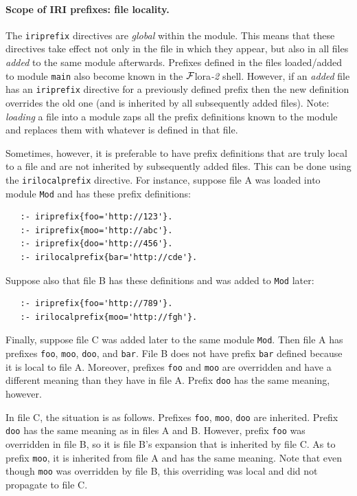 \documentclass[11pt]{article}
\newcommand{\FLORA}{{\mbox{\sc ${\cal F}${lora}\rm\emph{-2}}}\xspace}
\newcommand{\FLSYSTEM}{\FLORA}
\begin{document}
\paragraph{Scope of IRI prefixes: file locality.}
The \texttt{iriprefix}  directives are \emph{global} within the module. 
This means that these directives take effect not only in the file in which they appear,
but also in all files \emph{added} to the same module afterwards.
Prefixes defined in  the files loaded/added to module \texttt{main}  also
become known in the \FLSYSTEM shell. However, if an \emph{added} file has an
\texttt{iriprefix} directive for a previously defined prefix then the new
definition overrides the old one (and is inherited by all subsequently
added files). Note: \emph{loading}  a file into a module
zaps all the prefix definitions known  
to the module and replaces them with whatever is defined in that file.

Sometimes, however, it is preferable to have prefix definitions that are
truly local to a file and are not inherited by subsequently added files.
This can be done using the \texttt{irilocalprefix} directive. For instance,
suppose file A was loaded into module \texttt{Mod} and
has these prefix definitions:
\begin{verbatim}
   :- iriprefix{foo='http://123'}.
   :- iriprefix{moo='http://abc'}.
   :- iriprefix{doo='http://456'}.
   :- irilocalprefix{bar='http://cde'}.
\end{verbatim}
Suppose also that file B has these definitions and was added to
\texttt{Mod} later: 
\begin{verbatim}
   :- iriprefix{foo='http://789'}.
   :- irilocalprefix{moo='http://fgh'}.
\end{verbatim}
Finally, suppose file C was added later to the same module \texttt{Mod}.
Then file A has prefixes \texttt{foo}, \texttt{moo}, \texttt{doo}, and
\texttt{bar}. File B does not have prefix \texttt{bar} defined because it
is local to file A. Moreover, prefixes \texttt{foo} and \texttt{moo} are
overridden and have a different meaning than they have in file A. Prefix
\texttt{doo} has the same meaning, however.

In file C, the situation is as follows. Prefixes \texttt{foo},
\texttt{moo}, \texttt{doo} are inherited. Prefix \texttt{doo} has the same
meaning as in files A and B. However, prefix \texttt{foo} was overridden
in file B, so it is file B's expansion that is inherited by file C.
As to prefix \texttt{moo}, it is inherited from file A and has the same
meaning. Note that even though \texttt{moo} was overridden by file B, this
overriding was local and did not propagate to file C.  
\end{document}
